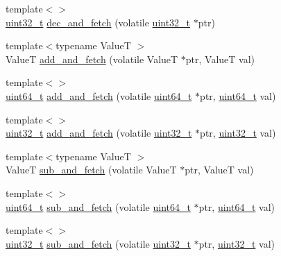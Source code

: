 \begin{DoxyCompactItemize}
{\footnotesize template$<$$>$ }\\\hyperlink{stdint_8h_a435d1572bf3f880d55459d9805097f62}{uint32\+\_\+t} \hyperlink{namespaceleveldb_a248d8995cc0b4f3817cbfcc504e0f059}{dec\+\_\+and\+\_\+fetch} (volatile \hyperlink{stdint_8h_a435d1572bf3f880d55459d9805097f62}{uint32\+\_\+t} $\ast$ptr)
\item 
{\footnotesize template$<$typename Value\+T $>$ }\\Value\+T \hyperlink{namespaceleveldb_a4d4bc2d891ebb3c725cb8364baf6e2a6}{add\+\_\+and\+\_\+fetch} (volatile Value\+T $\ast$ptr, Value\+T val)
\item 
{\footnotesize template$<$$>$ }\\\hyperlink{stdint_8h_aaa5d1cd013383c889537491c3cfd9aad}{uint64\+\_\+t} \hyperlink{namespaceleveldb_a0975a76e5dd0dc8846e5048e7e2567f1}{add\+\_\+and\+\_\+fetch} (volatile \hyperlink{stdint_8h_aaa5d1cd013383c889537491c3cfd9aad}{uint64\+\_\+t} $\ast$ptr, \hyperlink{stdint_8h_aaa5d1cd013383c889537491c3cfd9aad}{uint64\+\_\+t} val)
\item 
{\footnotesize template$<$$>$ }\\\hyperlink{stdint_8h_a435d1572bf3f880d55459d9805097f62}{uint32\+\_\+t} \hyperlink{namespaceleveldb_a176cf157fd5368af50a2070377152fa8}{add\+\_\+and\+\_\+fetch} (volatile \hyperlink{stdint_8h_a435d1572bf3f880d55459d9805097f62}{uint32\+\_\+t} $\ast$ptr, \hyperlink{stdint_8h_a435d1572bf3f880d55459d9805097f62}{uint32\+\_\+t} val)
\item 
{\footnotesize template$<$typename Value\+T $>$ }\\Value\+T \hyperlink{namespaceleveldb_ae691d90ebc34252c3f5be20f6d904c92}{sub\+\_\+and\+\_\+fetch} (volatile Value\+T $\ast$ptr, Value\+T val)
\item 
{\footnotesize template$<$$>$ }\\\hyperlink{stdint_8h_aaa5d1cd013383c889537491c3cfd9aad}{uint64\+\_\+t} \hyperlink{namespaceleveldb_a31c7f849de2ce850c86705e27c64046e}{sub\+\_\+and\+\_\+fetch} (volatile \hyperlink{stdint_8h_aaa5d1cd013383c889537491c3cfd9aad}{uint64\+\_\+t} $\ast$ptr, \hyperlink{stdint_8h_aaa5d1cd013383c889537491c3cfd9aad}{uint64\+\_\+t} val)
\item 
{\footnotesize template$<$$>$ }\\\hyperlink{stdint_8h_a435d1572bf3f880d55459d9805097f62}{uint32\+\_\+t} \hyperlink{namespaceleveldb_a2747d6b8f90127c39a7c5f534ac0abdd}{sub\+\_\+and\+\_\+fetch} (volatile \hyperlink{stdint_8h_a435d1572bf3f880d55459d9805097f62}{uint32\+\_\+t} $\ast$ptr, \hyperlink{stdint_8h_a435d1572bf3f880d55459d9805097f62}{uint32\+\_\+t} val)

\end{DoxyCompactItemize}
